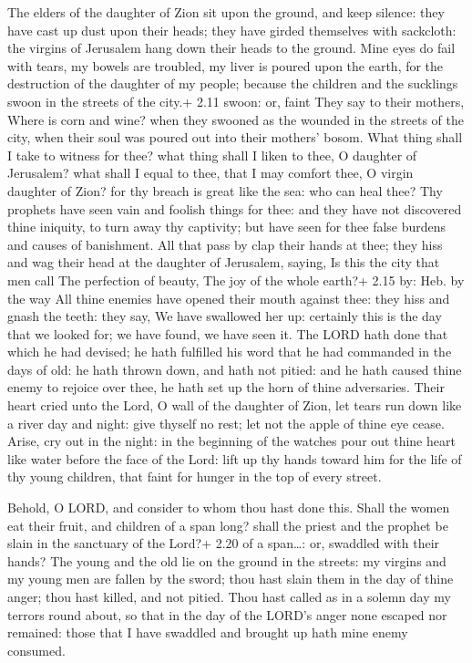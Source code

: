 The elders of the daughter of Zion sit upon the ground,
and keep silence: they have cast up dust upon their heads; they have
girded themselves with sackcloth: the virgins of Jerusalem hang down
their heads to the ground.  Mine eyes do fail with tears,
my bowels are troubled, my liver is poured upon the earth, for the
destruction of the daughter of my people; because the children and the
sucklings swoon in the streets of the city.+ 2.11 swoon: or, faint
 They say to their mothers, Where is corn and wine? when
they swooned as the wounded in the streets of the city, when their soul
was poured out into their mothers' bosom.  What thing shall
I take to witness for thee? what thing shall I liken to thee, O daughter
of Jerusalem? what shall I equal to thee, that I may comfort thee, O
virgin daughter of Zion? for thy breach is great like the sea: who can
heal thee?  Thy prophets have seen vain and foolish things
for thee: and they have not discovered thine iniquity, to turn away thy
captivity; but have seen for thee false burdens and causes of
banishment.  All that pass by clap their hands at thee;
they hiss and wag their head at the daughter of Jerusalem, saying, Is
this the city that men call The perfection of beauty, The joy of the
whole earth?+ 2.15 by: Heb. by the way  All thine enemies
have opened their mouth against thee: they hiss and gnash the teeth:
they say, We have swallowed her up: certainly this is the day that we
looked for; we have found, we have seen it.  The LORD hath
done that which he had devised; he hath fulfilled his word that he had
commanded in the days of old: he hath thrown down, and hath not pitied:
and he hath caused thine enemy to rejoice over thee, he hath set up the
horn of thine adversaries.  Their heart cried unto the
Lord, O wall of the daughter of Zion, let tears run down like a river
day and night: give thyself no rest; let not the apple of thine eye
cease.  Arise, cry out in the night: in the beginning of
the watches pour out thine heart like water before the face of the Lord:
lift up thy hands toward him for the life of thy young children, that
faint for hunger in the top of every street.

 Behold, O LORD, and consider to whom thou hast done
this. Shall the women eat their fruit, and children of a span long?
shall the priest and the prophet be slain in the sanctuary of the Lord?+
2.20 of a span\ldots: or, swaddled with their hands?  The
young and the old lie on the ground in the streets: my virgins and my
young men are fallen by the sword; thou hast slain them in the day of
thine anger; thou hast killed, and not pitied.  Thou hast
called as in a solemn day my terrors round about, so that in the day of
the LORD's anger none escaped nor remained: those that I have swaddled
and brought up hath mine enemy consumed.

